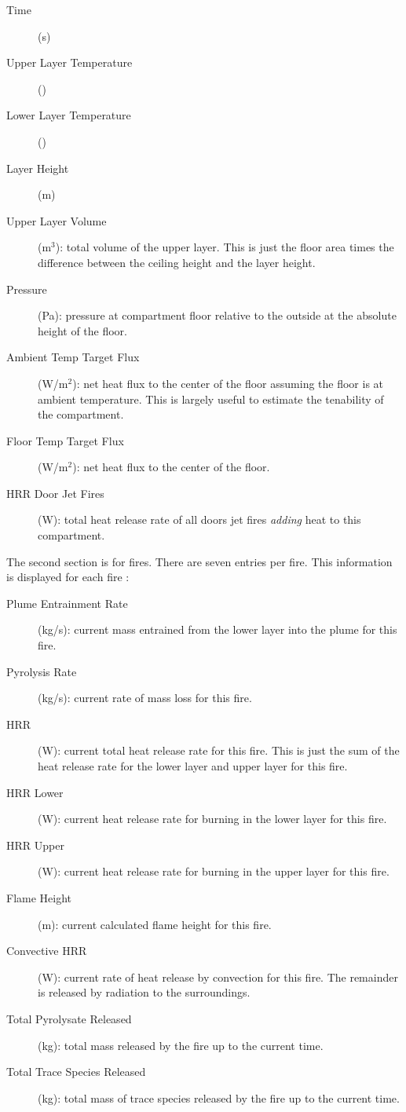 \begin{description}
\item[Time] (s)
\item[Upper Layer Temperature] (\degc)
\item[Lower Layer Temperature] (\degc)
\item[Layer Height]  (m)
\item[ Upper Layer Volume] (m$^3$): total volume of the upper layer. This is just the floor area times the difference between the ceiling height and the layer height.
\item[ Pressure] (Pa): pressure at compartment floor relative to the outside at the absolute height of the floor.
\item[Ambient Temp Target Flux] (W/m$^2$): net heat flux to the center of the floor assuming the floor is at ambient temperature.  This is largely useful to estimate the tenability of the compartment.
\item[Floor Temp Target Flux] (W/m$^2$): net heat flux to the center of the floor.
\item[HRR Door Jet Fires] (W): total heat release rate of all doors jet fires \emph{adding} heat to this compartment.
\end{description}
The second section is for fires. There are seven entries per fire.  This information is displayed for each fire :
\begin{description}
\item[Plume Entrainment Rate] (kg/s): current mass entrained from the lower layer into the plume for this fire.
\item[Pyrolysis Rate] (kg/s): current rate of mass loss for this fire.
\item[HRR] (W): current total heat release rate for this fire. This is just the sum of the heat release rate for the lower layer and upper layer for this fire.
\item[HRR Lower] (W): current heat release rate for burning in the lower layer for this fire.
\item[HRR Upper] (W):  current heat release rate for burning in the upper layer for this fire.
\item[Flame Height] (m): current calculated flame height for this fire.
\item[Convective HRR] (W): current rate of heat release by convection for this fire.  The remainder is released by radiation to the surroundings.
\item[Total Pyrolysate Released] (kg): total mass released by the fire up to the current time.
\item[Total Trace Species Released] (kg): total mass of trace species released by the fire up to the current time.
\end{description}

